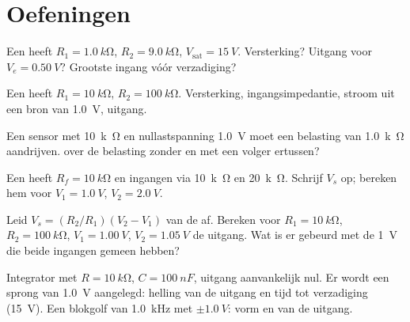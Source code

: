 \section{Oefeningen}

\begin{exercise}[$\star$]\label{exo:b1:operational-amplifier:1}
Een  heeft $R_1 = \qty{1.0}{k\ohm}$, $R_2 =
\qty{9.0}{k\ohm}$, $V_{\mathrm{sat}} = \qty{15}{V}$. Versterking? Uitgang voor
$V_e = \qty{0.50}{V}$? Grootste ingang vóór verzadiging?
\end{exercise}

\begin{exercise}[$\star$]\label{exo:b1:operational-amplifier:2}
Een  heeft $R_1 = \qty{10}{k\ohm}$, $R_2 = \qty{100}{k\ohm}$.
Versterking, ingangsimpedantie, stroom uit een bron van \qty{1.0}{V}, uitgang.
\end{exercise}

\begin{exercise}[$\star$]\label{exo:b1:operational-amplifier:3}
Een sensor met  \qty{10}{k\ohm} en nullastspanning
\qty{1.0}{V} moet een belasting van \qty{1.0}{k\ohm} aandrijven.  over
de belasting zonder en met een volger ertussen?
\end{exercise}

\begin{exercise}[$\star$]\label{exo:b1:operational-amplifier:4}
Een  heeft $R_f = \qty{10}{k\ohm}$ en ingangen via
\qty{10}{k\ohm} en \qty{20}{k\ohm}. Schrijf $V_s$ op; bereken hem voor
$V_1 = \qty{1.0}{V}$, $V_2 = \qty{2.0}{V}$.
\end{exercise}

\begin{exercise}[$\star\star$]\label{exo:b1:operational-amplifier:5}
Leid $V_s = (R_2/R_1)(V_2 - V_1)$ van de  af. Bereken voor
$R_1 = \qty{10}{k\ohm}$, $R_2 = \qty{100}{k\ohm}$, $V_1 = \qty{1.00}{V}$,
$V_2 = \qty{1.05}{V}$ de uitgang. Wat is er gebeurd met de \qty{1}{V} die beide
ingangen gemeen hebben?
\end{exercise}

\begin{exercise}[$\star\star$]\label{exo:b1:operational-amplifier:6}
Integrator met $R = \qty{10}{k\ohm}$, $C = \qty{100}{nF}$, uitgang
aanvankelijk nul. Er wordt een sprong van \qty{1.0}{V} aangelegd: helling van de uitgang en
tijd tot verzadiging (\qty{15}{V}). Een blokgolf van \qty{1.0}{kHz} met
$\pm\qty{1.0}{V}$: vorm en  van de uitgang.
\end{exercise}

